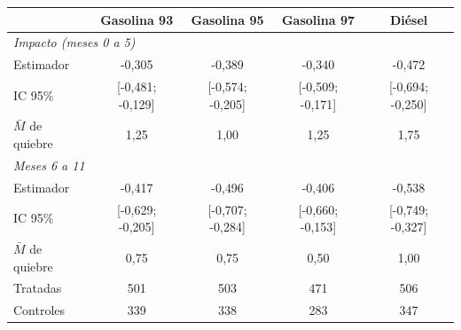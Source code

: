 \begin{tabular}{lcccc}
\toprule
 & Gasolina 93 & Gasolina 95 & Gasolina 97 & Diésel \\
\midrule
\multicolumn{5}{l}{\emph{Impacto (meses 0 a 5)}} \\
\quad Estimador & -0{,}305 & -0{,}389 & -0{,}340 & -0{,}472 \\
\quad IC 95\% & [-0{,}481; -0{,}129] & [-0{,}574; -0{,}205] & [-0{,}509; -0{,}171] & [-0{,}694; -0{,}250] \\
\quad $\bar{M}$ de quiebre & 1{,}25 & 1{,}00 & 1{,}25 & 1{,}75 \\
\multicolumn{5}{l}{\emph{Meses 6 a 11}} \\
\quad Estimador & -0{,}417 & -0{,}496 & -0{,}406 & -0{,}538 \\
\quad IC 95\% & [-0{,}629; -0{,}205] & [-0{,}707; -0{,}284] & [-0{,}660; -0{,}153] & [-0{,}749; -0{,}327] \\
\quad $\bar{M}$ de quiebre & 0{,}75 & 0{,}75 & 0{,}50 & 1{,}00 \\
\midrule
Tratadas & 501 & 503 & 471 & 506 \\
Controles & 339 & 338 & 283 & 347 \\
\bottomrule
\end{tabular}
